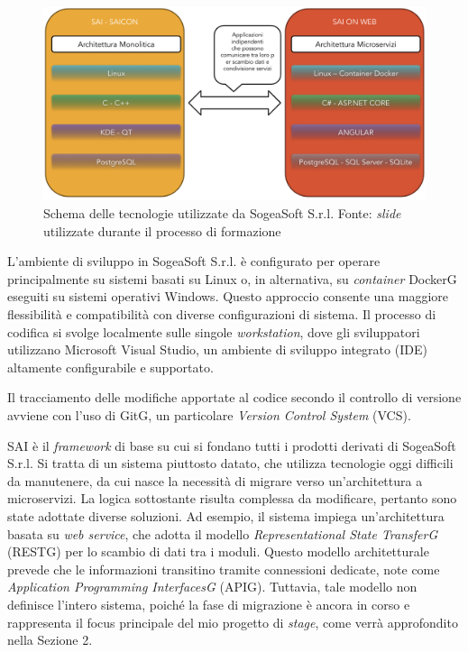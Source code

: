     \begin{figure}[H]
        \centering
        \includegraphics[width=0.8\linewidth]{BCS-Tessi/images/Tecnologie.png}
        \caption[Tecnologie utilizzate in SogeaSoft S.r.l.]{Schema delle tecnologie utilizzate da SogeaSoft S.r.l. Fonte: \textit{slide} utilizzate durante il processo di formazione}
        \label{fig:Tecnologie}
    \end{figure}

    \noindent L'ambiente di sviluppo in SogeaSoft S.r.l. è configurato per operare principalmente su sistemi basati su Linux o, in alternativa, su \textit{container} DockerG eseguiti su sistemi operativi Windows. Questo approccio consente una maggiore flessibilità e compatibilità con diverse configurazioni di sistema. Il processo di codifica si svolge localmente sulle singole \textit{workstation}, dove gli sviluppatori utilizzano Microsoft Visual Studio, un ambiente di sviluppo integrato (IDE) altamente configurabile e supportato.

    \noindent Il tracciamento delle modifiche apportate al codice secondo il controllo di versione avviene con l'uso di GitG, un particolare \textit{Version Control System} (VCS). 

    \noindent 
    SAI è il \textit{framework} di base su cui si fondano tutti i prodotti derivati di SogeaSoft S.r.l. Si tratta di un sistema piuttosto datato, che utilizza tecnologie oggi difficili da manutenere, da cui nasce la necessità di migrare verso un'architettura a microservizi. La logica sottostante risulta complessa da modificare, pertanto sono state adottate diverse soluzioni. Ad esempio, il sistema impiega un'architettura basata su \textit{web service}, che adotta il modello \textit{Representational State TransferG} (RESTG) per lo scambio di dati tra i moduli. Questo modello architetturale prevede che le informazioni transitino tramite connessioni dedicate, note come \textit{Application Programming InterfacesG} (APIG). Tuttavia, tale modello non definisce l'intero sistema, poiché la fase di migrazione è ancora in corso e rappresenta il focus principale del mio progetto di \textit{stage}, come verrà approfondito nella Sezione 2.
    
